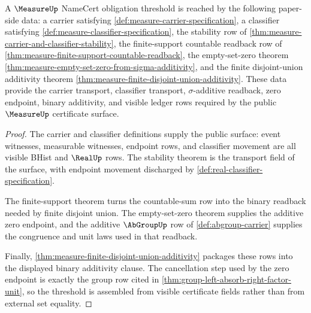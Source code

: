 \begin{theorem}
\label{thm:measure-certificate-obligation-threshold}
A $\MeasureUp$ NameCert obligation threshold is reached by the following paper-side data: a carrier satisfying \autoref{def:measure-carrier-specification}, a classifier satisfying \autoref{def:measure-classifier-specification}, the stability row of \autoref{thm:measure-carrier-and-classifier-stability}, the finite-support countable readback row of \autoref{thm:measure-finite-support-countable-readback}, the empty-set-zero theorem \autoref{thm:measure-empty-set-zero-from-sigma-additivity}, and the finite disjoint-union additivity theorem \autoref{thm:measure-finite-disjoint-union-additivity}. These data provide the carrier transport, classifier transport, $\sigma$-additive readback, zero endpoint, binary additivity, and visible ledger rows required by the public $\MeasureUp$ certificate surface.
\end{theorem}
\begin{proof}
The carrier and classifier definitions supply the public surface: event witnesses, measurable witnesses, endpoint rows, and classifier movement are all visible BHist and $\RealUp$ rows. The stability theorem is the transport field of the surface, with endpoint movement discharged by \autoref{def:real-classifier-specification}.

The finite-support theorem turns the countable-sum row into the binary readback needed by finite disjoint union. The empty-set-zero theorem supplies the additive zero endpoint, and the additive $\AbGroupUp$ row of \autoref{def:abgroup-carrier} supplies the congruence and unit laws used in that readback.

Finally, \autoref{thm:measure-finite-disjoint-union-additivity} packages these rows into the displayed binary additivity clause. The cancellation step used by the zero endpoint is exactly the group row cited in \autoref{thm:group-left-absorb-right-factor-unit}, so the threshold is assembled from visible certificate fields rather than from external set equality.
\end{proof}

